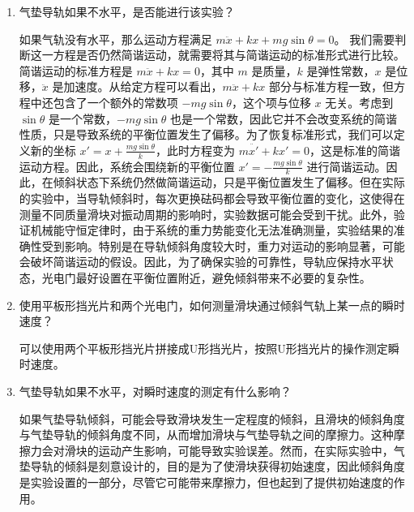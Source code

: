 \documentclass[zihao=5, UTF8]{article}
\theoremstyle{MyLineTheoremStyle} %
\theoremstyle{MyBlockTheoremStyle} %
\theoremstyle{MySubsubsectionStyle} %
\begin{document}
\begin{enumerate}
        在理想情况下，测量周期时光电门可以不位于平衡位置上，因为根据简谐运动的基本方程$x(t) = A \cos(\omega t + \varphi)$，可以看出，物体两次沿相同方向经过同一个$x_0$，时间间隔恰好为$T$。在实际测量中，滑块在平衡位置时的速度最大，因此挡光时间最短，导致测量周期的误差较小。而如果滑块距离平衡位置过远，振幅可能会迅速衰减，导致在测量进行到几组数据后，振幅减小至无法到达光电门的位置。因此，为了保证准确性，光电门最好放置在平衡位置或其附近。
        
    \item 气垫导轨如果不水平，是否能进行该实验？
    
        
如果气轨没有水平，那么运动方程满足 \( m\ddot{x} + kx + mg\sin\theta = 0 \)。 我们需要判断这一方程是否仍然简谐运动，就需要将其与简谐运动的标准形式进行比较。简谐运动的标准方程是 \( m\ddot{x} + kx = 0 \)，其中 \( m \) 是质量，\( k \) 是弹性常数，\( x \) 是位移，\( \ddot{x} \) 是加速度。从给定方程可以看出，\( m\ddot{x} + kx \) 部分与标准方程一致，但方程中还包含了一个额外的常数项 \( -mg\sin\theta \)，这个项与位移 \( x \) 无关。考虑到 \( \sin\theta \) 是一个常数，\( -mg\sin\theta \) 也是一个常数，因此它并不会改变系统的简谐性质，只是导致系统的平衡位置发生了偏移。为了恢复标准形式，我们可以定义新的坐标 \( x' = x + \frac{mg\sin\theta}{k} \)，此时方程变为 \( m\ddot{x'} + kx' = 0 \)，这是标准的简谐运动方程。因此，系统会围绕新的平衡位置 \( x' = -\frac{mg\sin\theta}{k} \) 进行简谐运动。因此，在倾斜状态下系统仍然做简谐运动，只是平衡位置发生了偏移。但在实际的实验中，当导轨倾斜时，每次更换砝码都会导致平衡位置的变化，这使得在测量不同质量滑块对振动周期的影响时，实验数据可能会受到干扰。此外，验证机械能守恒定律时，由于系统的重力势能变化无法准确测量，实验结果的准确性受到影响。特别是在导轨倾斜角度较大时，重力对运动的影响显著，可能会破坏简谐运动的假设。因此，为了确保实验的可靠性，导轨应保持水平状态，光电门最好设置在平衡位置附近，避免倾斜带来不必要的复杂性。

        
    \item 使用平板形挡光片和两个光电门，如何测量滑块通过倾斜气轨上某一点的瞬时速度？
    
       可以使用两个平板形挡光片拼接成U形挡光片，按照U形挡光片的操作测定瞬时速度。 
        
    \item 气垫导轨如果不水平，对瞬时速度的测定有什么影响？
    
        如果气垫导轨倾斜，可能会导致滑块发生一定程度的倾斜，且滑块的倾斜角度与气垫导轨的倾斜角度不同，从而增加滑块与气垫导轨之间的摩擦力。这种摩擦力会对滑块的运动产生影响，可能导致实验误差。然而，在实际实验中，气垫导轨的倾斜是刻意设计的，目的是为了使滑块获得初始速度，因此倾斜角度是实验设置的一部分，尽管它可能带来摩擦力，但也起到了提供初始速度的作用。
        

\end{enumerate}
\end{document}
